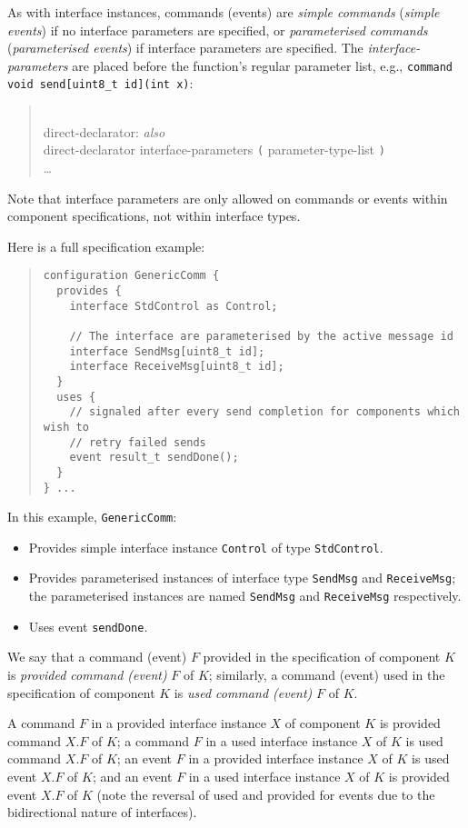\documentclass[11pt,letterpaper]{article}
\newcommand{\kw}[1]{{\tt #1}}
\newcommand{\code}[1]{{\tt #1}}
\newcommand{\grammarshift}{\vspace*{-.7cm}}
\newcommand{\grammarindent}{\hspace*{2cm}\= \\ \kill}
\begin{document}
As with interface instances, commands (events) are \emph{simple commands}
(\emph{simple events}) if no interface parameters are specified, or
\emph{parameterised commands} (\emph{parameterised events}) if interface
parameters are specified. The \emph{interface-parameters} are placed before
the function's regular parameter list, e.g., \code{command void
send[uint8\_t id](int x)}: \begin{quote} \grammarshift \em \begin{tabbing}
\grammarindent
direct-declarator: \emph{also}\\
\>	direct-declarator interface-parameters \kw{(} parameter-type-list \kw{)}\\
\>	\ldots
\end{tabbing} \end{quote}
Note that interface parameters are only allowed on commands or events within
component specifications, not within interface types.

Here is a full specification example:
\begin{quote} \begin{verbatim}
configuration GenericComm {
  provides {
    interface StdControl as Control;
    
    // The interface are parameterised by the active message id
    interface SendMsg[uint8_t id];
    interface ReceiveMsg[uint8_t id];
  }
  uses {
    // signaled after every send completion for components which wish to
    // retry failed sends
    event result_t sendDone();
  }
} ...
\end{verbatim} \end{quote}
In this example, \code{GenericComm}:
\begin{itemize}
\item Provides simple interface instance \code{Control} of type
\code{StdControl}.
\item Provides parameterised instances of interface type \code{SendMsg} and
\code{ReceiveMsg}; the parameterised instances are named \code{SendMsg} and
\code{ReceiveMsg} respectively.
\item Uses event \code{sendDone}.
\end{itemize}

We say that a command (event) $F$ provided in the specification of
component $K$ is \emph{provided command (event)} $F$ of $K$; similarly, a
command (event) used in the specification of component $K$ is \emph{used
command (event)} $F$ of $K$.

A command $F$ in a provided interface instance $X$ of component $K$ is
provided command $X.F$ of $K$; a command $F$ in a used interface instance
$X$ of $K$ is used command $X.F$ of $K$; an event $F$ in a provided
interface instance $X$ of $K$ is used event $X.F$ of $K$; and an event $F$
in a used interface instance $X$ of $K$ is provided event $X.F$ of $K$
(note the reversal of used and provided for events due to the bidirectional
nature of interfaces). 
\end{document}
